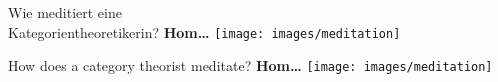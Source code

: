 \documentclass[a4paper,ngerman,landscape,30pt]{scrartcl}
\begin{document}
\begin{center}
  \Huge\sffamily
  Wie meditiert eine \\ Kategorientheoretikerin?
  \textbf{\phantom{\ldots}Hom\ldots}
  \vfill
  \texttt{[image: images/meditation]}
\end{center}
\newpage

\begin{center}
  \Huge\sffamily
  How does a category theorist meditate?
  \textbf{\phantom{\ldots}Hom\ldots}
  \vfill
  \texttt{[image: images/meditation]}
\end{center}
\newpage

\end{document}
